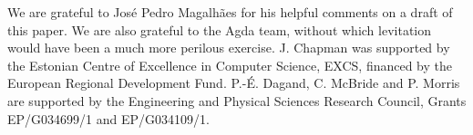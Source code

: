 \documentclass[authoryear]{sigplanconf}
\begin{document}





\acks

We are grateful to Jos\'{e} Pedro Magalh\~{a}es for his helpful
comments on a draft of this paper. We are also grateful to the Agda
team, without which levitation would have been a much more perilous
exercise. J. Chapman was supported by the Estonian Centre of
Excellence in Computer Science, EXCS, financed by the European
Regional Development Fund. P.-\'{E}. Dagand, C. McBride and P. Morris
are supported by the Engineering and Physical Sciences Research
Council, Grants EP/G034699/1 and EP/G034109/1.







\end{document}

